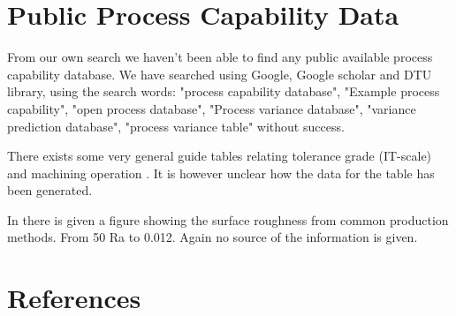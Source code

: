 \documentclass[aip,amsmath,reprint, author-year]{revtex4-1}
\begin{document}
\section{Public Process Capability Data}
From our own search we haven't been able to find any public available process capability database. We have searched using Google, Google scholar and DTU library, using the search words: "process capability database", "Example process capability", "open process database", "Process variance database", "variance prediction database", "process variance table" without success. 

There exists some very general guide tables relating tolerance grade (IT-scale) and machining operation \citep{united1967preferred, american1978preferred}. It is however unclear how the data for the table has been generated.

In \cite[p. 715]{oberg2008machinery} there is given a figure showing the surface roughness from common production methods. From 50 Ra to 0.012. Again no source of the information is given. \\[1cm]

\section*{References}

\end{document}
